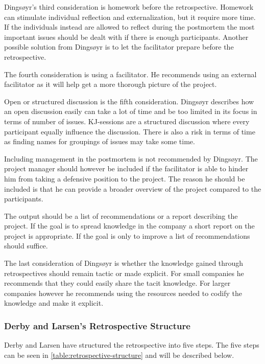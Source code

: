 Dingsøyr's third consideration is homework before the retrospective. Homework can stimulate individual reflection and externalization, but it require more time. If the individuals instead are allowed to reflect during the postmortem the most important issues should be dealt with if there is enough participants. Another possible solution from Dingsøyr is to let the facilitator prepare before the retrospective. 

The fourth consideration is using a facilitator. He recommends using an external facilitator as it will help get a more thorough picture of the project.

Open or structured discussion is the fifth consideration. Dingsøyr describes how an open discussion easily can take a lot of time and be too limited in its focus in terms of number of issues. KJ-sessions are a structured discussion where every participant equally influence the discussion. There is also a risk in terms of time as finding names for groupings of issues may take some time. 

Including management in the postmortem is not recommended by Dingsøyr. The project manager should however be included if the facilitator is able to hinder him from taking a defensive position to the project. The reason he should be included is that he can provide a broader overview of the project compared to the participants. 

The output should be a list of recommendations or a report describing the project. If the goal is to spread knowledge in the company a short report on the project is appropriate. If the goal is only to improve a list of recommendations should suffice. 

The last consideration of Dingsøyr is whether the knowledge gained through retrospectives should remain tactic or made explicit. For small companies he recommends that they could easily share the tacit knowledge. For larger companies however he recommends using the resources needed to codify the knowledge and make it explicit. 

\subsubsection{Derby and Larsen's Retrospective Structure}
\label{section:Derby-Larsen-Structure}
Derby and Larsen \cite{Larsen2006} have structured the retrospective into five steps. The five steps can be seen in \autoref{table:retrospective-structure} and will be described below. 

